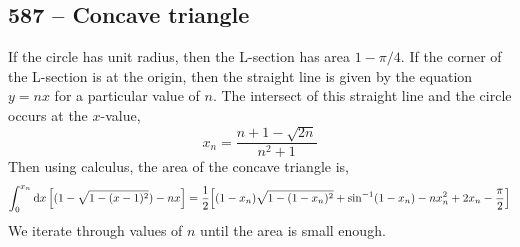 \documentclass{article}
\begin{document}
\subsection*{587 -- Concave triangle}
If the circle has unit radius, then the L-section has area $1 - \pi/4$.
If the corner of the L-section is at the origin, then the straight line is given by the equation $y = nx$ for a particular value of $n$.
The intersect of this straight line and the circle occurs at the $x$-value,
\[ x_n = \frac{n+1-\sqrt{2n}}{n^2+1} \]
Then using calculus, the area of the concave triangle is,
\[ \int_0^{x_n} \dd{x} \qty[(1 - \sqrt{1 - (x-1)^2}) - nx]  = \frac{1}{2} \qty[ (1-x_n) \sqrt{1 - (1 - x_n)^2} + \sin^{-1}(1-x_n) - nx_n^2 + 2x_n - \frac{\pi}{2} ] \]
We iterate through values of $n$ until the area is small enough.
\end{document}
